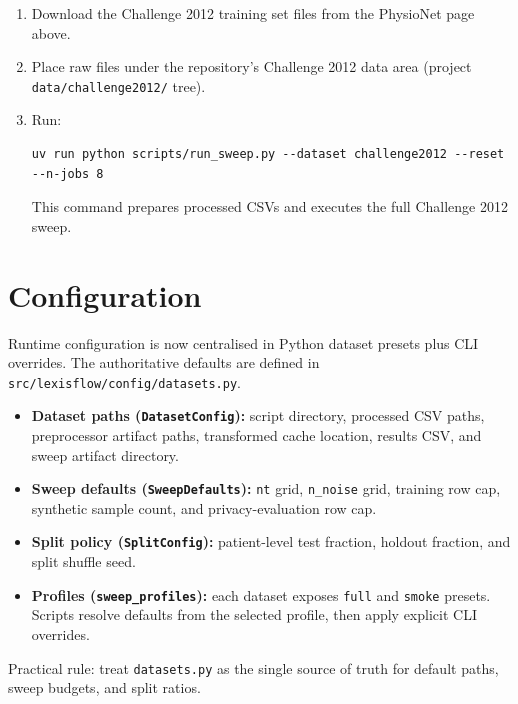 \begin{enumerate}\tightlist
    \item Download the Challenge 2012 training set files from the PhysioNet page above.
    \item Place raw files under the repository's Challenge 2012 data area (project \texttt{data/challenge2012/} tree).
    \item Run:
    \begin{verbatim}
uv run python scripts/run_sweep.py --dataset challenge2012 --reset --n-jobs 8
    \end{verbatim}
    This command prepares processed CSVs and executes the full Challenge 2012 sweep.
\end{enumerate}

\section{Configuration}

Runtime configuration is now centralised in Python dataset presets plus CLI overrides.
The authoritative defaults are defined in \texttt{src/lexisflow/config/datasets.py}.

\begin{itemize}\tightlist
    \item \textbf{Dataset paths (\texttt{DatasetConfig}):} script directory, processed CSV paths, preprocessor artifact paths, transformed cache location, results CSV, and sweep artifact directory.
    \item \textbf{Sweep defaults (\texttt{SweepDefaults}):} \texttt{nt} grid, \texttt{n\_noise} grid, training row cap, synthetic sample count, and privacy-evaluation row cap.
    \item \textbf{Split policy (\texttt{SplitConfig}):} patient-level test fraction, holdout fraction, and split shuffle seed.
    \item \textbf{Profiles (\texttt{sweep\_profiles}):} each dataset exposes \texttt{full} and \texttt{smoke} presets. Scripts resolve defaults from the selected profile, then apply explicit CLI overrides.
\end{itemize}

Practical rule: treat \texttt{datasets.py} as the single source of truth for default
paths, sweep budgets, and split ratios.

